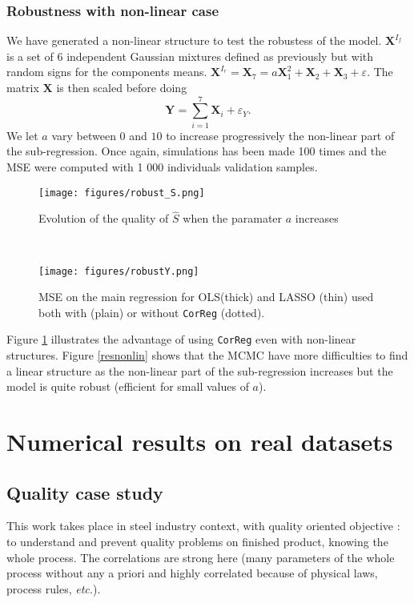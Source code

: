 \documentclass[12pt,a4paper]{report}
\begin{document}
\subsection{Robustness with non-linear case}

We have generated a non-linear structure to test the robustess of the model. $\boldsymbol{X}^{I_f}$ is a set of 6 independent Gaussian mixtures defined as previously but with random signs for the components means. $\boldsymbol{X}^{I_r}=\boldsymbol{X}_7=a\boldsymbol{X}_1^2+\boldsymbol{X}_2+\boldsymbol{X}_3+ \varepsilon$. The matrix $\boldsymbol{X}$ is then scaled before doing $$\boldsymbol{Y}=\sum_{i=1}^7\boldsymbol{X}_i+\varepsilon_Y.$$ We let $a$ vary between $0$ and $10$ to increase progressively the non-linear part of the sub-regression. Once again, simulations has been made 100 times and the MSE were computed with 1 000 individuals validation samples.

 \begin{figure}[h!] 
	\begin{minipage}[l]{.48\linewidth}
			\texttt{[image: figures/robust\_S.png]} 
			\caption{Evolution of the quality of $\hat{S}$ when the paramater $a$ increases}\label{resnonlin}
	\end{minipage} \
   \begin{minipage}[r]{.48\linewidth}
			\texttt{[image: figures/robustY.png]} 
			\caption{MSE on the main regression for OLS(thick) and LASSO (thin) used both with (plain) or without {\tt CorReg} (dotted).}\label{MSEnonlin}
   \end{minipage}
\end{figure}
Figure \ref{MSEnonlin} illustrates the advantage of using {\tt CorReg} even with non-linear structures. Figure \ref{resnonlin} shows that the MCMC have more difficulties to find a linear structure as the non-linear part of the sub-regression increases but the model is quite robust (efficient for small values of $a$).

	\FloatBarrier	
\chapter{Numerical results on real datasets} \label{sectionrealcase}
	\section{Quality case study} \label{sectionexfos}
This work takes place in steel industry context, with quality oriented objective : to understand and prevent quality problems on finished product, knowing the whole process. The correlations are strong here (many parameters of the whole process without any a priori and highly correlated because of physical laws, process rules, {\it etc.}). 
		
\end{document}
